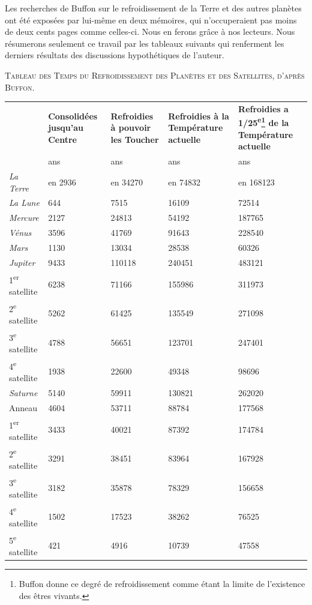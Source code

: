 \documentclass[a4paper, 11pt, oneside, landscape]{article}
\begin{document}
Les recherches de Buffon sur le refroidissement de la Terre et des autres planètes ont été exposées par lui-même en deux mémoires, qui n'occuperaient pas moins de deux cents pages comme celles-ci. Nous en ferons grâce à nos lecteurs. Nous résumerons seulement ce travail par les tableaux suivants qui renferment les derniers résultats des discussions hypothétiques de l'auteur.
\begin{center}
\scshape
\small
Tableau des Temps du Refroidissement des Planètes et des Satellites, d'après Buffon.
\end{center}
\begin{center}
    \centering
    \bfseries
    \footnotesize
    \begin{longtable}{l p{15mm} p{15mm} p{25mm} p{25mm}}
        ~ & \textbf{Consolidées jusqu'au Centre} & \textbf{Refroidies à pouvoir les Toucher} & \textbf{Refroidies à la Température actuelle} & \textbf{Refroidies a 1/25\textsuperscript{e}\footnote{Buffon donne ce degré de refroidissement comme étant la limite de l'existence des êtres vivants.} de la Température actuelle} \\
        ~ & ans & ans & ans & ans \\
        \emph{La Terre} & en 2936 & en 34270 & en 74832 & en 168123 \\
        \emph{La Lune} & 644 & 7515 & 16109 & 72514 \\
        \emph{Mercure} & 2127 & 24813 & 54192 & 187765 \\
        \emph{Vénus} & 3596 & 41769 & 91643 & 228540 \\
        \emph{Mars} & 1130 & 13034 & 28538 & 60326 \\
        \emph{Jupiter} & 9433 & 110118 & 240451 & 483121 \\
        1\textsuperscript{er} satellite & 6238 & 71166 & 155986 & 311973 \\
        2\textsuperscript{e} satellite & 5262 & 61425 & 135549 & 271098 \\
        3\textsuperscript{e} satellite & 4788 & 56651 & 123701 & 247401 \\
        4\textsuperscript{e} satellite & 1938 & 22600 & 49348 & 98696 \\
        \emph{Saturne} & 5140 & 59911 & 130821 & 262020 \\
        Anneau & 4604 & 53711 & 88784 & 177568 \\
        1\textsuperscript{er} satellite & 3433 & 40021 & 87392 & 174784 \\
        2\textsuperscript{e} satellite & 3291 & 38451 & 83964 & 167928 \\
        3\textsuperscript{e} satellite & 3182 & 35878 & 78329 & 156658 \\
        4\textsuperscript{e} satellite & 1502 & 17523 & 38262 & 76525 \\
        5\textsuperscript{e} satellite & 421 & 4916 & 10739 & 47558 \\
    \end{longtable}
\end{center}
\end{document}
